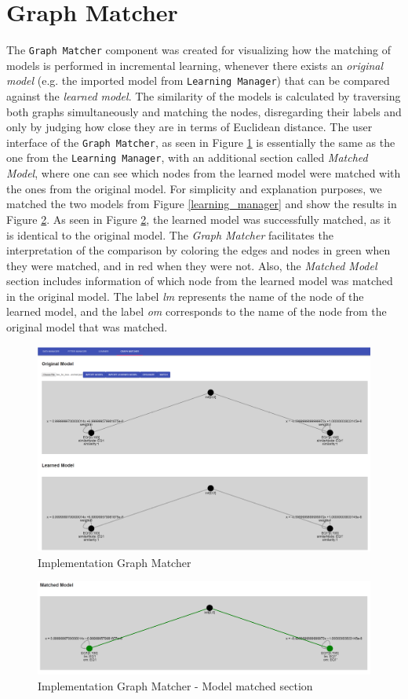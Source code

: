 \section{Graph Matcher}
The \texttt{Graph Matcher} component was created for visualizing how the matching of models is performed in incremental learning, whenever there exists an \textit{original model} (e.g. the imported model from \texttt{Learning Manager}) that can be compared against the \textit{learned model}. 
%
The similarity of the models is calculated by traversing both graphs simultaneously and matching the nodes, disregarding their labels and only by judging how close they are in terms of Euclidean distance. The user interface of the \texttt{Graph Matcher}, as seen in Figure \ref{graph_matcher} is essentially the same as the one from the \texttt{Learning Manager}, with an additional section called \textit{Matched Model}, where one can see which nodes from the learned model were matched with the ones from the original model. For simplicity and explanation purposes, we matched the two models from Figure \ref{learning_manager} and show the results in Figure \ref{graph_matcher_matched}. As seen in Figure \ref{graph_matcher_matched}, the learned model was successfully matched, as it is identical to the original model. The \textit{Graph Matcher} facilitates the interpretation of the comparison by coloring the edges and nodes in green when they were matched, and in red when they were not. Also, the \textit{Matched Model} section includes information of which node from the learned model was matched in the original model. The label \textit{lm} represents the name of the node of the learned model, and the label \textit{om} corresponds to the name of the node from the original model that was matched.
%
\begin{figure}[h]
	\centering
	\includegraphics[scale=0.25]{./pictures/implementation/Graph_Matcher.png}
	\caption{Implementation Graph Matcher}
	\label{graph_matcher}
\end{figure}
\begin{figure}[h]
	\centering
	\includegraphics[scale=0.25]{./pictures/implementation/Graph_Matcher_1.png}
	\caption{Implementation Graph Matcher - Model matched section}
	\label{graph_matcher_matched}
\end{figure}




